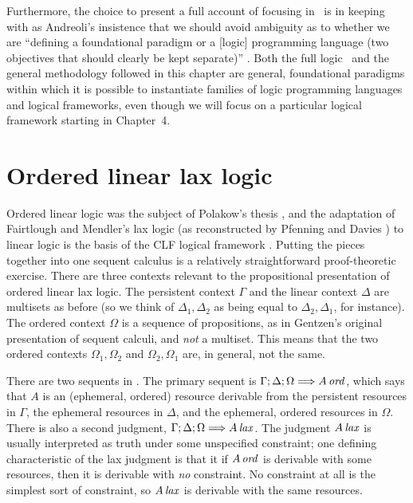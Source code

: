 Furthermore, the choice to present a full account of focusing in
\ollll~is in keeping with as Andreoli's insistence that we should
avoid ambiguity as to whether we are ``defining a foundational
paradigm or a [logic] programming language (two objectives that should
clearly be kept separate)'' \cite{andreoli01focussing}. Both the full
logic \ollll~and the general methodology followed in this chapter are
general, foundational paradigms within which it is possible to
instantiate families of logic programming languages and logical
frameworks, even though we will focus on a particular logical
framework starting in Chapter~4.

\section{Ordered linear lax logic}
\label{sec:ord-unfocused}

Ordered linear logic was the subject of Polakow's thesis
\cite{polakow01ordered}, and the adaptation of Fairtlough and
Mendler's lax logic \cite{fairtlough95propositional} (as reconstructed
by Pfenning and Davies \cite{pfenning01judgmental}) to linear logic is
the basis of the CLF logical framework
\cite{watkins02concurrent}. Putting the pieces together into one
sequent calculus is a relatively straightforward proof-theoretic
exercise. There are three contexts relevant to the propositional
presentation of ordered linear lax logic.  The persistent context
$\Gamma$ and the linear context $\Delta$ are multisets as before (so
we think of $\Delta_1, \Delta_2$ as being equal to $\Delta_2,
\Delta_1$, for instance). The ordered context $\Omega$ is a sequence
of propositions, as in Gentzen's original presentation of sequent
calculi, and {\it not} a multiset.  This means that the two ordered
contexts $\Omega_1, \Omega_2$ and $\Omega_2, \Omega_1$ are, in
general, not the same.



There are two sequents in \ollll.  The primary sequent is
${\Gamma};{\Delta};{\Omega} \Longrightarrow {{A}\,{{\it ord}}} \mathstrut$, which says that $A$ is an
(ephemeral, ordered) resource derivable from the persistent resources
in $\Gamma$, the ephemeral resources in $\Delta$, and the ephemeral,
ordered resources in $\Omega$. There is also a second judgment,
${\Gamma};{\Delta};{\Omega} \Longrightarrow {{A}\,{{\it lax}}} \mathstrut$. The judgment ${A}\,{{\it lax}}$
is usually interpreted as truth under some unspecified constraint; one
defining characteristic of the lax judgment is that it if ${A}\,{{\it ord}}$
is derivable with some resources, then it is derivable with {\it no}
constraint. No constraint at all is the simplest sort of constraint,
so ${A}\,{{\it lax}}$ is derivable with the same resources.

